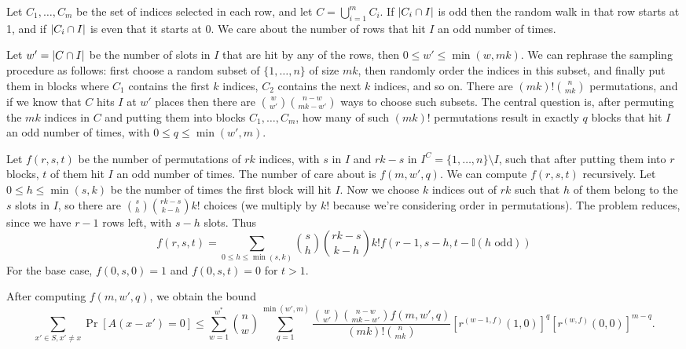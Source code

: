 \documentclass[11pt]{article}
\begin{document}
Let $C_1, \dots, C_m$ be the set of indices selected in each row, and let $C =
\bigcup_{i=1}^m C_i$.
If $\left\lvert C_i \cap I\right\rvert$ is odd then the random walk in that row starts at 1, and if
$\left\lvert C_i \cap I\right\rvert$ is even that it starts at 0.
We care about the number of rows that hit $I$ an odd number of times.

Let $w' = \left\lvert C \cap I\right\rvert$ be the number of slots in $I$ that are hit by any of the
rows, then $0 \leq w' \leq \min(w, mk)$.
We can rephrase the sampling procedure as follows: first choose a random subset
of $\{ 1, \dots, n \}$ of size $mk$, then randomly order the indices in this
subset, and finally put them in blocks where $C_1$ contains the first $k$
indices, $C_2$ contains the next $k$ indices, and so on.
There are $(mk)! 
\binom{n}{mk}$ permutations, and if we know that $C$ hits $I$ at $w'$ places
then there are $\binom{w}{w'} \binom{n - w}{mk - w'}$ ways to choose such
subsets.
The central question is, after permuting the $mk$ indices in $C$ and putting them
into blocks $C_1, \dots, C_m$, how many of such $(mk)!$ permutations result
in exactly $q$ blocks that hit $I$ an odd number of times, with $0 \leq q \leq \min(w', m)$.

Let $f(r, s, t)$ be the number of permutations of $rk$ indices, with $s$ in $I$
and $rk - s$ in $I^C = \{ 1, \dots, n \} \setminus I$, such that after putting them into
$r$ blocks, $t$ of them hit $I$ an odd number of times.
The number of care about is $f(m, w', q)$.
We can compute $f(r, s, t)$ recursively.
Let $0 \leq h \leq \min(s, k)$ be the number of times the first block will hit $I$.
Now we choose $k$ indices out of $rk$ such that $h$ of them belong to the $s$
slots in $I$, so there are $\binom{s}{h} \binom{rk - s}{k - h} k!$ choices (we
multiply by $k!$ because we're considering order in permutations).
The problem reduces, since we have $r - 1$ rows left, with $s - h$ slots.
Thus
\begin{equation*}
  f(r, s, t) = \sum_{0 \leq h \leq \min(s, k)} \binom{s}{h}
  \binom{rk-s}{k - h} k! f(r-1, s-h,
  t-\mathbb{I}(h \text{ odd})) 
\end{equation*}
For the base case, $f(0, s, 0) = 1$ and $f(0, s, t) = 0$ for $t > 1$.

After computing $f(m, w', q)$, we obtain the bound
\begin{equation*}
  \sum_{x' \in S, x' \neq x} \Pr[A(x - x') = 0] \leq \sum_{w=1}^{w^*} \binom{n}{w} \sum_{q=1}^{\min(w', m)}
    \frac{\binom{w}{w'} \binom{n - w}{mk-w'} f(m, w', q)}{(mk)! \binom{n}{mk}}
    [r^{(w-1, f)}(1, 0)]^q [r^{(w, f)}(0, 0)]^{m-q}.
  \label{eq:k_large_with_replacement}
\end{equation*}


\end{document}
